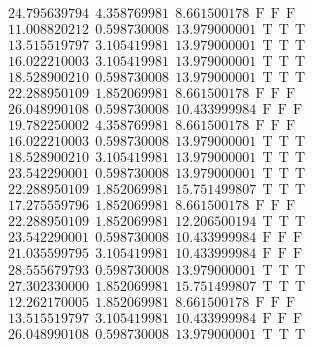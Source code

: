\documentclass[10pt,a4paper]{article}
\begin{document}
\begin{itemize}
\begin{displaymath}
{\begin{aligned}
&24.795639794 ~~   4.358769981 ~~   8.661500178  ~~\mathrm{F  ~~ F  ~~  F} \\ 
&11.008820212 ~~   0.598730008 ~~  13.979000001  ~~\mathrm{T  ~~ T  ~~ T } \\ 
&13.515519797 ~~   3.105419981 ~~  13.979000001  ~~\mathrm{T  ~~ T  ~~ T } \\ 
&16.022210003 ~~   3.105419981 ~~  13.979000001  ~~\mathrm{T  ~~ T  ~~ T } \\ 
&18.528900210 ~~   0.598730008 ~~  13.979000001  ~~\mathrm{T  ~~ T  ~~ T } \\ 
&22.288950109 ~~   1.852069981 ~~   8.661500178  ~~\mathrm{F  ~~ F  ~~  F} \\ 
&26.048990108 ~~   0.598730008 ~~  10.433999984  ~~\mathrm{F  ~~ F  ~~  F} \\ 
&19.782250002 ~~   4.358769981 ~~   8.661500178  ~~\mathrm{F  ~~ F  ~~  F} \\ 
&16.022210003 ~~   0.598730008 ~~  13.979000001  ~~\mathrm{T  ~~ T  ~~ T } \\ 
&18.528900210 ~~   3.105419981 ~~  13.979000001  ~~\mathrm{T  ~~ T  ~~ T } \\ 
&23.542290001 ~~   0.598730008 ~~  13.979000001  ~~\mathrm{T  ~~ T  ~~ T } \\ 
&22.288950109 ~~   1.852069981 ~~  15.751499807  ~~\mathrm{T  ~~ T  ~~ T } \\ 
&17.275559796 ~~   1.852069981 ~~   8.661500178  ~~\mathrm{F  ~~ F  ~~  F} \\ 
&22.288950109 ~~   1.852069981 ~~  12.206500194  ~~\mathrm{T  ~~ T  ~~ T } \\ 
&23.542290001 ~~   0.598730008 ~~  10.433999984  ~~\mathrm{F  ~~ F  ~~  F} \\ 
&21.035599795 ~~   3.105419981 ~~  10.433999984  ~~\mathrm{F  ~~ F  ~~  F} \\ 
&28.555679793 ~~   0.598730008 ~~  13.979000001  ~~\mathrm{T  ~~ T  ~~ T } \\ 
&27.302330000 ~~   1.852069981 ~~  15.751499807  ~~\mathrm{T  ~~ T  ~~ T } \\ 
&12.262170005 ~~   1.852069981 ~~   8.661500178  ~~\mathrm{F  ~~ F  ~~  F} \\ 
&13.515519797 ~~   3.105419981 ~~  10.433999984  ~~\mathrm{F  ~~ F  ~~  F} \\ 
&26.048990108 ~~   0.598730008 ~~  13.979000001  ~~\mathrm{T  ~~ T  ~~ T } \\ 
				\end{aligned}
			}
		\end{displaymath}

\end{itemize}
\end{document}
